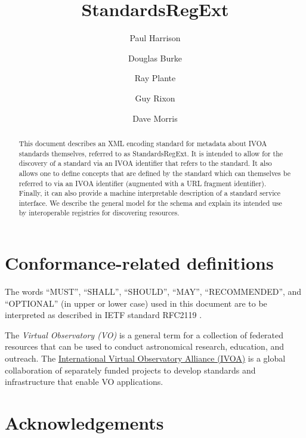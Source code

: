 \documentclass[11pt,a4paper]{ivoa}
\author[http://www.ivoa.net/twiki/bin/view/IVOA/PaulHarrison]{Paul Harrison}
\author[http://www.ivoa.net/twiki/bin/view/IVOA/DougBurke]{Douglas Burke}
\author[http://www.ivoa.net/twiki/bin/view/IVOA/RayPlante]{Ray Plante}
\author[http://www.ivoa.net/twiki/bin/view/IVOA/GuyRixon]{Guy Rixon}
\author[http://www.ivoa.net/twiki/bin/view/IVOA/DaveMorris]{Dave Morris}
\title{StandardsRegExt}
\begin{document}
\begin{abstract}
This document describes an XML encoding standard for metadata about
IVOA standards themselves, referred to as StandardsRegExt.  It is intended
to allow for the discovery of a standard via an IVOA identifier that
refers to the standard.  It also allows one to define concepts that
are defined by the standard which can themselves be referred to via an
IVOA identifier (augmented with a URL fragment identifier).  Finally,
it can also provide a machine interpretable description of a standard
service interface.  We describe the general model for the schema and
explain its intended use by interoperable registries for discovering
resources.
\end{abstract}


\section*{Conformance-related definitions}

The words ``MUST'', ``SHALL'', ``SHOULD'', ``MAY'', ``RECOMMENDED'', and
``OPTIONAL'' (in upper or lower case) used in this document are to be
interpreted as described in IETF standard RFC2119 \citep{std:RFC2119}.

The \emph{Virtual Observatory (VO)} is a
general term for a collection of federated resources that can be used
to conduct astronomical research, education, and outreach.
The \href{https://www.ivoa.net}{International
Virtual Observatory Alliance (IVOA)} is a global
collaboration of separately funded projects to develop standards and
infrastructure that enable VO applications.

\section*{Acknowledgements}
\end{document}
